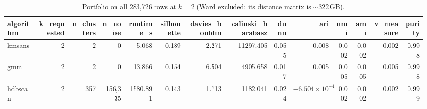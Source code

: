 \begin{table}[htbp]
\centering
\begin{tabular}{lrrrrrrrrrrrrr}
\toprule
algorithm & k\_requested & n\_clusters & n\_noise & runtime\_s & silhouette & davies\_bouldin & calinski\_harabasz & dunn & ari & nmi & ami & v\_measure & purity \\
\midrule
kmeans & 2 & 2 & 0 & 5.068 & 0.189 & 2.271 & 11297.405 & 0.055 & 0.008 & 0.002 & 0.002 & 0.002 & 0.998 \\
gmm & 2 & 2 & 0 & 13.866 & 0.154 & 6.504 & 4905.658 & 0.017 & 0.005 & 0.005 & 0.005 & 0.005 & 0.998 \\
hdbscan & 2 & 357 & 156{,}335 & 1580.891 & 0.143 & 1.713 & 1182.041 & 0.024 & $-6.504\times 10^{-4}$ & 0.002 & 0.002 & 0.002 & 0.999 \\
\bottomrule
\end{tabular}
\caption{Portfolio on all 283{,}726 rows at $k=2$ (Ward excluded: its distance matrix is $\sim$322\,GB).}
\label{tab:portfolio-full}
\end{table}
